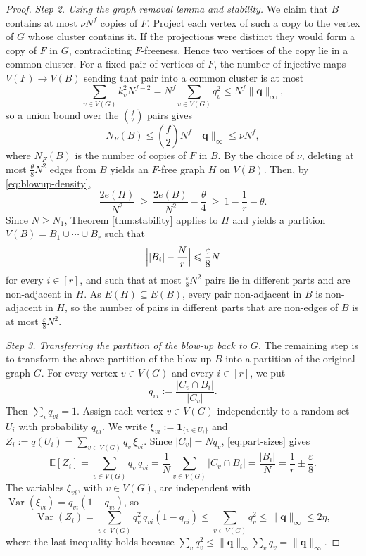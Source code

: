 \documentclass[10pt,a4paper]{amsart}
\newcommand{\EE}{\mathbb{E}}
\newcommand{\Var}{\operatorname{Var}}
\renewcommand{\ge}{\geqslant}
\renewcommand{\le}{\leqslant}
\begin{document}
\begin{proof}
\noindent
\textit{Step 2. Using the graph removal lemma and stability.} 
We claim that $B$ contains at most $\nu N^f$  
copies of $F$. Project each vertex of such a copy to
the vertex of $G$ whose cluster contains it. If the
projections were distinct they would form a copy of
$F$ in $G$, contradicting $F$-freeness. Hence two
vertices of the copy lie in a common cluster. For a
fixed pair of vertices of $F$, the number of injective
maps $V(F)\to V(B)$ sending that pair into a common
cluster is at most
\[
  \sum_{v\in V(G)}k_v^2N^{f-2}
  =N^f\sum_{v\in V(G)}q_v^2
  \le N^f\lVert\bm q\rVert_\infty ,
\]
so a union bound over the $\binom f2$ pairs gives
\[
  N_F(B)\le\binom f2N^f\lVert\bm q\rVert_\infty
  \le\nu N^f,
\]
where $N_F(B)$ is the number of copies of $F$
in $B$. By the choice of $\nu$, deleting at most
$\frac{\theta}{8}N^2$ edges from $B$ yields an
$F$-free graph $H$ on $V(B)$.  Then, by
\eqref{eq:blowup-density},
\[
  \frac{2e(H)}{N^2}\ \ge\ \frac{2e(B)}{N^2}
  -\frac{\theta}{4}
  \ \ge\ 1-\frac1r-\theta .
\]
Since $N\ge N_1$, Theorem \ref{thm:stability} applies
to $H$ and yields a partition
$V(B)=B_1\cup\cdots\cup B_r$ such that 
\begin{equation}\label{eq:part-sizes}
  \Bigl\lvert|B_i|-\frac Nr\Bigr\rvert
  \le\frac{\varepsilon}{8}N
\end{equation}
for every $i\in [r]$, and such that at most $\frac{\varepsilon}{8}N^2$ pairs lie
in different parts and are non-adjacent in $H$. As
$E(H)\subseteq E(B)$, every pair non-adjacent in $B$
is non-adjacent in $H$, so
the number of pairs in different parts that are
  non-edges of $B$ is at most $\frac{\varepsilon}{8}N^2$.

\smallskip 
\noindent
\textit{Step 3. Transferring the partition of the blow-up back to $G$.}
The remaining step is to transform the above partition of the blow-up $B$ into a partition of the original graph $G$.  
For every vertex $v\in V(G)$ and every $i\in[r]$, 
we put  
$$q_{vi}:= \frac{| C_v\cap B_i|}{| C_v|}. $$
Then $\sum_{i}q_{vi}=1$. 
Assign each vertex 
$v\in V(G)$
independently to a random set $U_i$ with probability $q_{vi}$. 
We write $\xi_{vi}:=\mathbf 1_{\{v\in U_i\}}$ 
and $Z_i:=q(U_i)=\sum_{v\in V(G)}q_v\,\xi_{vi}$. Since
$\lvert C_v\rvert=Nq_v$, \eqref{eq:part-sizes} gives
\begin{equation}\label{eq:Zi-expectation}
  \EE[Z_i]=\sum_{v\in V(G)}q_v \, q_{vi}
  =\frac1N\sum_{v\in V(G)}\lvert C_v\cap B_i\rvert
  =\frac{|B_i|}{N}
  =\frac1r\pm\frac{\varepsilon}{8}.
\end{equation}
The variables $\xi_{vi}$, with $v\in V(G)$, are independent
with $\Var(\xi_{vi})=q_{vi}(1-q_{vi})$, so
\begin{equation}\label{eq:Zi-variance}
  \Var(Z_i)=\sum_{v\in V(G)}q_v^2 \, 
  q_{vi}(1-q_{vi})
  \le\sum_{v\in V(G)}q_v^2
  \le\lVert\bm q\rVert_\infty\le2\eta ,
\end{equation}
where the last inequality holds because
$\sum_vq_v^2\le \lVert\bm q\rVert_\infty 
\sum_v q_v = \lVert\bm q\rVert_\infty $.


\end{proof}
\end{document}
